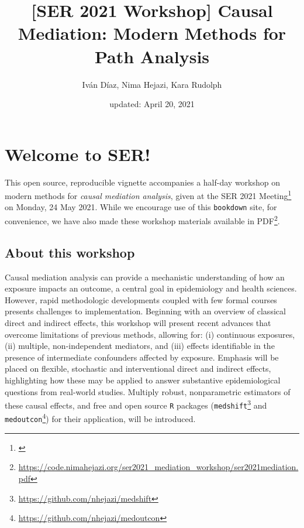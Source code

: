 \documentclass[
  12pt, krantz2,
]{book}
\title{{[}SER 2021 Workshop{]} Causal Mediation: Modern Methods for Path Analysis}
\author{Iván Díaz, Nima Hejazi, Kara Rudolph}
\date{updated: April 20, 2021}
\renewcommand{\href}[2]{#2\footnote{\url{#1}}}
\theoremstyle{definition}
\theoremstyle{definition}
\theoremstyle{definition}
\newcommand{\1}{\mathbbm{1}}
\begin{document}
\maketitle


\thispagestyle{empty}

\begin{center}

\end{center}

\setlength{\abovedisplayskip}{-5pt}
\setlength{\abovedisplayshortskip}{-5pt}

{
\hypersetup{linkcolor=}
\setcounter{tocdepth}{1}
\tableofcontents
}
\listoftables
\listoffigures
\hypertarget{welcome-to-ser}{%
\chapter*{Welcome to SER!}\label{welcome-to-ser}}


This open source, reproducible vignette accompanies a half-day workshop on
modern methods for \emph{causal mediation analysis}, given at the \href{}{SER 2021
Meeting} on Monday, 24 May 2021. While we encourage use of this \texttt{bookdown}
site, for convenience, we have also made these workshop materials \href{https://code.nimahejazi.org/ser2021_mediation_workshop/ser2021mediation.pdf}{available in
PDF}.

\hypertarget{about}{%
\section{About this workshop}\label{about}}

Causal mediation analysis can provide a mechanistic understanding of how an
exposure impacts an outcome, a central goal in epidemiology and health sciences.
However, rapid methodologic developments coupled with few formal courses
presents challenges to implementation. Beginning with an overview of classical
direct and indirect effects, this workshop will present recent advances that
overcome limitations of previous methods, allowing for: (i) continuous
exposures, (ii) multiple, non-independent mediators, and (iii) effects
identifiable in the presence of intermediate confounders affected by exposure.
Emphasis will be placed on flexible, stochastic and interventional direct and
indirect effects, highlighting how these may be applied to answer substantive
epidemiological questions from real-world studies. Multiply robust,
nonparametric estimators of these causal effects, and free and open source \texttt{R}
packages (\href{https://github.com/nhejazi/medshift}{\texttt{medshift}} and
\href{https://github.com/nhejazi/medoutcon}{\texttt{medoutcon}}) for their application, will
be introduced.
\end{document}
